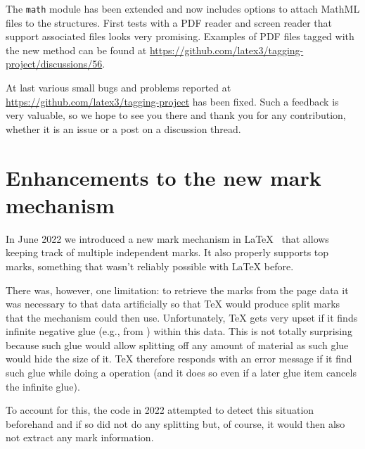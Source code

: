 \documentclass{ltnews}
\begin{document}
The \texttt{math} module has been extended and now includes
options to attach MathML files to the structures. 
First tests with a PDF reader and screen reader that support
associated files looks very promising. Examples of PDF files tagged with the 
new method can be found at 
\url{https://github.com/latex3/tagging-project/discussions/56}.

At last various small bugs and problems reported at 
\url{https://github.com/latex3/tagging-project}
has been fixed.  Such a feedback is very valuable, 
so we hope to see you there and thank you for
any contribution, whether it is an issue or a post on a discussion
thread.
    


\section{Enhancements to the new mark mechanism}

In June 2022 we introduced a new mark mechanism in
\LaTeX{}~\cite[p.~76]{39:ltnews} that allows keeping track of multiple
independent marks. It also  properly supports top marks, something that wasn't
reliably possible with \LaTeX{} before.

There was, however, one limitation: to retrieve the marks from the
page data it was necessary to  that data artificially so
that \TeX{} would produce split marks that the mechanism could then
use. Unfortunately, \TeX{} gets very upset if it finds infinite
negative glue (e.g., from ) within this data. This is not
totally surprising because such glue would allow splitting off any
amount of material as such glue would hide the size of it. \TeX{}
therefore responds with an error message if it find such glue while
doing a  operation (and it does so even if a later glue
item cancels the infinite glue).

To account for this, the code in 2022 attempted to detect this
situation beforehand and if so did not do any splitting but, of
course, it would then also not extract any mark information.
\end{document}
